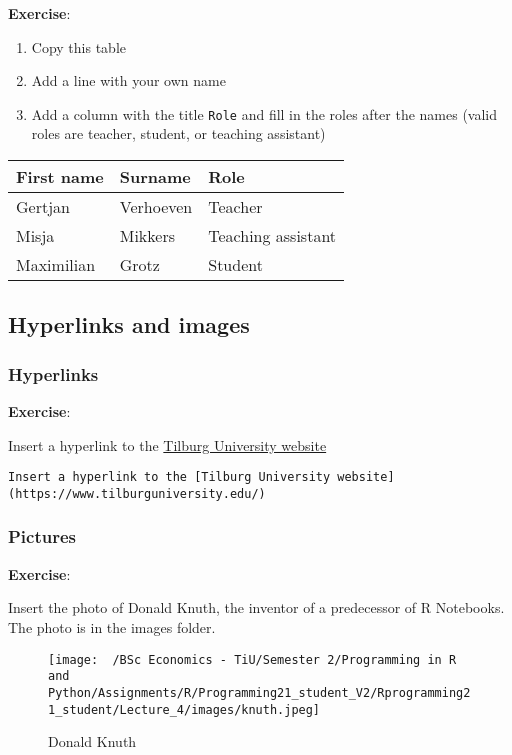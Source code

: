 \documentclass[
]{article}
\providecommand{\tightlist}{%
  \setlength{\itemsep}{0pt}\setlength{\parskip}{0pt}}
\begin{document}
\textbf{Exercise}:

\begin{enumerate}
\def\labelenumi{\alph{enumi}.}
\tightlist
\item
  Copy this table
\item
  Add a line with your own name
\item
  Add a column with the title \texttt{Role} and fill in the roles after
  the names (valid roles are teacher, student, or teaching assistant)
\end{enumerate}

\begin{longtable}[]{@{}lll@{}}
\toprule
First name & Surname & Role\tabularnewline
\midrule
\endhead
Gertjan & Verhoeven & Teacher\tabularnewline
Misja & Mikkers & Teaching assistant\tabularnewline
Maximilian & Grotz & Student\tabularnewline
\bottomrule
\end{longtable}

\hypertarget{hyperlinks-and-images}{%
\subsection{Hyperlinks and images}\label{hyperlinks-and-images}}

\hypertarget{hyperlinks}{%
\subsubsection{Hyperlinks}\label{hyperlinks}}

\textbf{Exercise}:

Insert a hyperlink to the
\href{https://www.tilburguniversity.edu/}{Tilburg University website}

\begin{verbatim}
Insert a hyperlink to the [Tilburg University website](https://www.tilburguniversity.edu/)
\end{verbatim}

\hypertarget{pictures}{%
\subsubsection{Pictures}\label{pictures}}

\textbf{Exercise}:

Insert the photo of Donald Knuth, the inventor of a predecessor of R
Notebooks. The photo is in the images folder.

\begin{figure}
\centering
\texttt{[image: ~/BSc Economics - TiU/Semester 2/Programming in R and Python/Assignments/R/Programming21\_student\_V2/Rprogramming21\_student/Lecture\_4/images/knuth.jpeg]}
\caption{Donald Knuth}
\end{figure}
\end{document}
